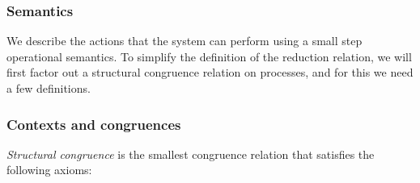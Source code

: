 

\subsubsection{Semantics}
We describe the actions that the system can perform using a small step operational semantics.
To simplify the definition of the reduction relation, we will first factor out a structural congruence relation on processes, and for this we need a few definitions.

\subsubsection{Contexts and congruences}



\emph{Structural congruence} is the smallest congruence relation that satisfies the following axioms:

